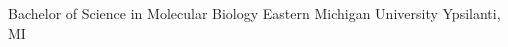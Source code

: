


\begin{cventries}


\cventry
{Bachelor of Science in Molecular Biology} %
{Eastern Michigan University} %
{Ypsilanti, MI} %
{} %
{ }%


\end{cventries}
\vspace{-5pt}